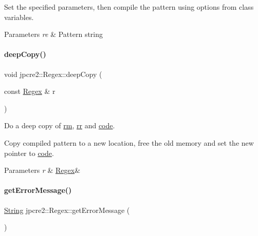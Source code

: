 Set the specified parameters, then compile the pattern using options from class variables. 
\begin{DoxyParams}{Parameters}
{\em re} & Pattern string \\
\hline
\end{DoxyParams}
\hypertarget{classjpcre2_1_1Regex_a240790a0f3d8e97af0a76ad3f882e02a_a240790a0f3d8e97af0a76ad3f882e02a}{}\label{classjpcre2_1_1Regex_a240790a0f3d8e97af0a76ad3f882e02a_a240790a0f3d8e97af0a76ad3f882e02a} 
\paragraph{\texorpdfstring{deep\+Copy()}{deepCopy()}}
{\footnotesize\ttfamily void jpcre2\+::\+Regex\+::deep\+Copy (\begin{DoxyParamCaption}\item[{const \hyperlink{classjpcre2_1_1Regex}{Regex} \&}]{r }\end{DoxyParamCaption})\hspace{0.3cm}{\ttfamily [private]}}



Do a deep copy of \hyperlink{classjpcre2_1_1Regex_a447925705d222dbbd8c7d60b98cc65f0}{rm}, \hyperlink{classjpcre2_1_1Regex_a5a7ac6c6288988079b8933b4b6637fab}{rr} and \hyperlink{classjpcre2_1_1Regex_a2742264206d8976c413b474b7bac4b2e}{code}. 

Copy compiled pattern to a new location, free the old memory and set the new pointer to \hyperlink{classjpcre2_1_1Regex_a2742264206d8976c413b474b7bac4b2e}{code}.


\begin{DoxyParams}{Parameters}
{\em r} & \hyperlink{classjpcre2_1_1Regex}{Regex}\& \\
\hline
\end{DoxyParams}
\hypertarget{classjpcre2_1_1Regex_a8606fff8b192c94f58ca9e82aa048c61_a8606fff8b192c94f58ca9e82aa048c61}{}\label{classjpcre2_1_1Regex_a8606fff8b192c94f58ca9e82aa048c61_a8606fff8b192c94f58ca9e82aa048c61} 
\paragraph{\texorpdfstring{get\+Error\+Message()}{getErrorMessage()}}
{\footnotesize\ttfamily \hyperlink{namespacejpcre2_a91f03070152fb228bc116c5a737f1d16}{String} jpcre2\+::\+Regex\+::get\+Error\+Message (\begin{DoxyParamCaption}{ }\end{DoxyParamCaption})\hspace{0.3cm}{\ttfamily [inline]}}



